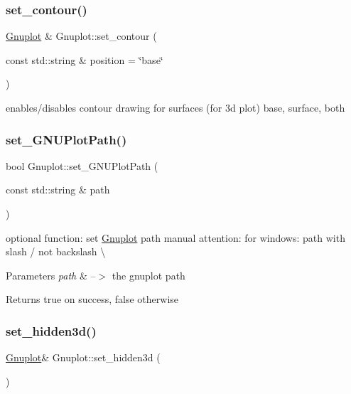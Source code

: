 \subsubsection{\texorpdfstring{set\+\_\+contour()}{set\_contour()}}
{\footnotesize\ttfamily \hyperlink{class_gnuplot}{Gnuplot} \& Gnuplot\+::set\+\_\+contour (\begin{DoxyParamCaption}\item[{const std\+::string \&}]{position = {\ttfamily \char`\"{}base\char`\"{}} }\end{DoxyParamCaption})}

enables/disables contour drawing for surfaces (for 3d plot) base, surface, both \mbox{\label{class_gnuplot_a67cae885c26ced821e335d98986f1967}} 
\subsubsection{\texorpdfstring{set\+\_\+\+G\+N\+U\+Plot\+Path()}{set\_GNUPlotPath()}}
{\footnotesize\ttfamily bool Gnuplot\+::set\+\_\+\+G\+N\+U\+Plot\+Path (\begin{DoxyParamCaption}\item[{const std\+::string \&}]{path }\end{DoxyParamCaption})\hspace{0.3cm}{\ttfamily [static]}}



optional function\+: set \hyperlink{class_gnuplot}{Gnuplot} path manual attention\+: for windows\+: path with slash \textquotesingle{}/\textquotesingle{} not backslash \textquotesingle{}\textbackslash{}\textquotesingle{} 


\begin{DoxyParams}{Parameters}
{\em path} & --$>$ the gnuplot path\\
\hline
\end{DoxyParams}
\begin{DoxyReturn}{Returns}
true on success, false otherwise 
\end{DoxyReturn}
\mbox{\label{class_gnuplot_a891f9800705eddc3f73886f265c009b8}} 
\subsubsection{\texorpdfstring{set\+\_\+hidden3d()}{set\_hidden3d()}}
{\footnotesize\ttfamily \hyperlink{class_gnuplot}{Gnuplot}\& Gnuplot\+::set\+\_\+hidden3d (\begin{DoxyParamCaption}{ }\end{DoxyParamCaption})\hspace{0.3cm}{\ttfamily [inline]}}

